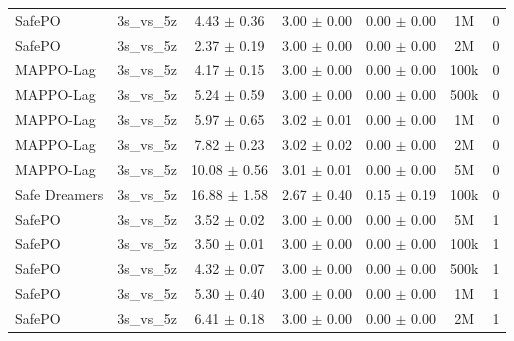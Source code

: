 \begin{longtable}{lcccccc}
SafePO & 3s\_vs\_5z & \textcolor{green!60!black}{4.43 $\pm$ 0.36} & \textcolor{green!60!black}{3.00 $\pm$ 0.00} & \textcolor{green!60!black}{0.00 $\pm$ 0.00} & 1M & 0 \\
SafePO & 3s\_vs\_5z & \textcolor{green!60!black}{2.37 $\pm$ 0.19} & \textcolor{green!60!black}{3.00 $\pm$ 0.00} & \textcolor{green!60!black}{0.00 $\pm$ 0.00} & 2M & 0 \\
MAPPO-Lag & 3s\_vs\_5z & \textcolor{green!60!black}{4.17 $\pm$ 0.15} & \textcolor{green!60!black}{3.00 $\pm$ 0.00} & \textcolor{green!60!black}{0.00 $\pm$ 0.00} & 100k & 0 \\
MAPPO-Lag & 3s\_vs\_5z & \textcolor{green!60!black}{5.24 $\pm$ 0.59} & \textcolor{green!60!black}{3.00 $\pm$ 0.00} & \textcolor{green!60!black}{0.00 $\pm$ 0.00} & 500k & 0 \\
MAPPO-Lag & 3s\_vs\_5z & \textcolor{green!60!black}{5.97 $\pm$ 0.65} & \textcolor{green!60!black}{3.02 $\pm$ 0.01} & \textcolor{green!60!black}{0.00 $\pm$ 0.00} & 1M & 0 \\
MAPPO-Lag & 3s\_vs\_5z & \textcolor{green!60!black}{7.82 $\pm$ 0.23} & \textcolor{green!60!black}{3.02 $\pm$ 0.02} & \textcolor{green!60!black}{0.00 $\pm$ 0.00} & 2M & 0 \\
MAPPO-Lag & 3s\_vs\_5z & \textcolor{green!60!black}{10.08 $\pm$ 0.56} & \textcolor{green!60!black}{3.01 $\pm$ 0.01} & \textcolor{green!60!black}{0.00 $\pm$ 0.00} & 5M & 0 \\
Safe Dreamers & 3s\_vs\_5z & 16.88 $\pm$ 1.58 & 2.67 $\pm$ 0.40 & 0.15 $\pm$ 0.19 & 100k & 0 \\
\midrule
SafePO & 3s\_vs\_5z & \textcolor{green!60!black}{3.52 $\pm$ 0.02} & \textcolor{green!60!black}{3.00 $\pm$ 0.00} & \textcolor{green!60!black}{0.00 $\pm$ 0.00} & 5M & 1 \\
SafePO & 3s\_vs\_5z & \textcolor{green!60!black}{3.50 $\pm$ 0.01} & \textcolor{green!60!black}{3.00 $\pm$ 0.00} & \textcolor{green!60!black}{0.00 $\pm$ 0.00} & 100k & 1 \\
SafePO & 3s\_vs\_5z & \textcolor{green!60!black}{4.32 $\pm$ 0.07} & \textcolor{green!60!black}{3.00 $\pm$ 0.00} & \textcolor{green!60!black}{0.00 $\pm$ 0.00} & 500k & 1 \\
SafePO & 3s\_vs\_5z & \textcolor{green!60!black}{5.30 $\pm$ 0.40} & \textcolor{green!60!black}{3.00 $\pm$ 0.00} & \textcolor{green!60!black}{0.00 $\pm$ 0.00} & 1M & 1 \\
SafePO & 3s\_vs\_5z & \textcolor{green!60!black}{6.41 $\pm$ 0.18} & \textcolor{green!60!black}{3.00 $\pm$ 0.00} & \textcolor{green!60!black}{0.00 $\pm$ 0.00} & 2M & 1 \\

\end{longtable}
